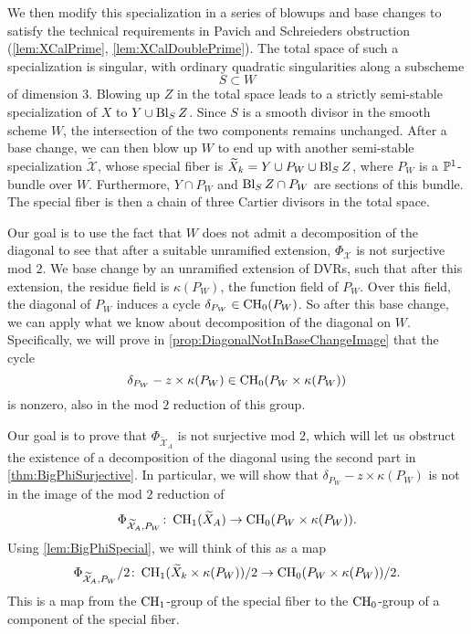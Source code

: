 We then modify this specialization in a series of blowups and base changes to satisfy the technical requirements in Pavich and Schreieders obstruction (\cref{lem:XCalPrime}, \cref{lem:XCalDoublePrime}). The total space of such a specialization is singular, with ordinary quadratic singularities along a subscheme
\[S \subset W\]
 of dimension 3. Blowing up $Z$ in the total space leads to a strictly semi-stable specialization of $X$ to $Y \cup \Bl_S Z$. Since $S$ is a smooth divisor in the smooth scheme $W$, the intersection of the two components remains unchanged. After a base change, we can then blow up $W$ to end up with another semi-stable specialization $\widetilde{\mathcal{X}}$, whose special fiber is $\widetilde{X}_k = Y \cup P_W \cup \Bl_S Z$, where $P_W$ is a $\P^1$-bundle over $W$. Furthermore, $Y \cap P_W$ and $\Bl_S Z \cap P_W$ are sections of this bundle. The special fiber is then a chain of three Cartier divisors in the total space. 

Our goal is to use the fact that $W$ does not admit a decomposition of the diagonal to see that after a suitable unramified extension, $\Phi_{\mathcal{X}}$ is not surjective mod $2$. We base change by an unramified extension of DVRs, such that after this extension, the residue field is $\kappa(P_W)$, the function field of $P_W$. Over this field, the diagonal of $P_W$ induces a cycle $\delta_{P_W} \in \CH_0(P_W)$. So after this base change, we can apply what we know about decomposition of the diagonal on $W$. Specifically, we will prove in \cref{prop:DiagonalNotInBaseChangeImage} that the cycle
\begin{equation}
	\label{eq:DiagonalCycleSummary}
	\delta_{P_W} - z \times \kappa(P_W) \in \CH_0(P_W \times \kappa(P_W))
\end{equation}
is nonzero, also in the mod $2$ reduction of this group.

Our goal is to prove that $\Phi_{\widetilde{\mathcal{X}}_A}$ is not surjective mod $2$, which will let us obstruct the existence of a decomposition of the diagonal using the second part in \cref{thm:BigPhiSurjective}. In particular, we will show that $\delta_{P_W} - z \times \kappa(P_W)$ is not in the image of the mod $2$ reduction of
\[\Phi_{\widetilde{\mathcal{X}}_A,P_W} \from \CH_1(\widetilde{X}_A) \to \CH_0(P_W \times \kappa(P_W)).\]
Using \cref{lem:BigPhiSpecial}, we will think of this as a map
\begin{equation}
	\label{eq:BigPhiSpecialFiberSummary}
	\Phi_{\widetilde{\mathcal{X}}_A,P_W}/2 \from \CH_1(\widetilde{X}_k \times \kappa(P_W))/2 \to \CH_0(P_W \times \kappa(P_W))/2.
\end{equation}
This is a map from the $\CH_1$-group of the special fiber to the $\CH_0$-group of a component of the special fiber.

